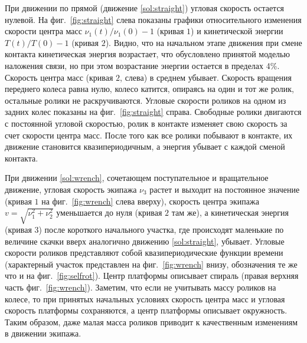 При движении по прямой (движение \ref{sol:straight}) угловая скорость остается нулевой.
На фиг.~\ref{fig:straight} слева показаны графики относительного изменения скорости центра масс $\nu_1(t)/\nu_1(0)-1$ (кривая $\textit{1}$) и кинетической энергии $T(t)/T(0)-1$ (кривая $\textit{2}$). Видно, что на начальном этапе движения при смене контакта кинетическая энергия возрастает, что обусловлено принятой моделью наложения связи, но при этом возрастание энергии остается в пределах 4\%. Скорость центра масс (кривая $\textit{2}$, слева) в среднем убывает. Скорость вращения переднего колеса равна нулю, колесо катится, опираясь на один и тот же ролик, остальные ролики не раскручиваются. Угловые скорости роликов на одном из задних колес показаны на фиг.~\ref{fig:straight} справа. Свободные ролики двигаются с постоянной угловой скоростью, ролик в контакте изменяет свою скорость за счет скорости центра масс. После того как все ролики побывают в контакте, их движение становится квазипериодичным, а энергия убывает с каждой сменой контакта. 

При движении \ref{sol:wrench}, сочетающем поступательное и вращательное движение, угловая скорость экипажа $\nu_3$ растет и выходит на постоянное значение (кривая $\textit{1}$ на фиг.~\ref{fig:wrench} слева вверху), скорость центра экипажа $v = \sqrt{\nu_1^2+\nu_2^2}$ уменьшается до нуля (кривая $\textit{2}$ там же), а кинетическая энергия (кривая $\textit{3}$) после короткого начального участка, где происходят маленькие по величине скачки вверх аналогично движению \ref{sol:straight}, убывает. Угловые скорости роликов представляют собой квазипериодические функции времени (характерный участок представлен на фиг.~\ref{fig:wrench} внизу, обозначения те же что и на фиг.~\ref{fig:selfrot}). Центр платформы описывает спираль (правая верхняя часть фиг.~\ref{fig:wrench}). Заметим, что если не учитывать массу роликов на колесе, то при принятых начальных условиях скорость центра масс и угловая скорость платформы сохраняются, а центр платформы описывает окружность. Таким образом, даже малая масса роликов приводит к качественным изменениям в движении экипажа.


